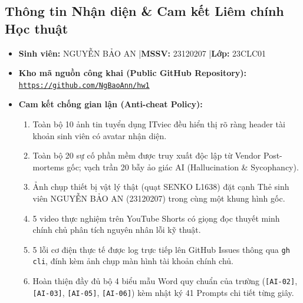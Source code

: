 \documentclass[11pt,a4paper]{article}
\begin{document}
\subsection{Thông tin Nhận diện \& Cam kết Liêm chính Học thuật}
\begin{itemize}
    \item \textbf{Sinh viên:} NGUYỄN BẢO AN \quad|\quad \textbf{MSSV:} 23120207 \quad|\quad \textbf{Lớp:} 23CLC01
    \item \textbf{Kho mã nguồn công khai (Public GitHub Repository):} \href{https://github.com/NgBaoAnn/hw1}{\texttt{https://github.com/NgBaoAnn/hw1}}
    \item \textbf{Cam kết chống gian lận (Anti-cheat Policy):}
    \begin{enumerate}
        \item Toàn bộ 10 ảnh tin tuyển dụng ITviec đều hiển thị rõ ràng header tài khoản sinh viên có avatar nhận diện.
        \item Toàn bộ 20 sự cố phần mềm được truy xuất độc lập từ Vendor Post-mortems gốc; vạch trần 20 bẫy ảo giác AI (Hallucination \& Sycophancy).
        \item Ảnh chụp thiết bị vật lý thật (quạt SENKO L1638) đặt cạnh Thẻ sinh viên NGUYỄN BẢO AN (23120207) trong cùng một khung hình gốc.
        \item 5 video thực nghiệm trên YouTube Shorts có giọng đọc thuyết minh chính chủ phân tích nguyên nhân lỗi kỹ thuật.
        \item 5 lỗi cơ điện thực tế được log trực tiếp lên GitHub Issues thông qua \texttt{gh cli}, đính kèm ảnh chụp màn hình tài khoản chính chủ.
        \item Hoàn thiện đầy đủ bộ 4 biểu mẫu Word quy chuẩn của trường (\texttt{[AI-02]}, \texttt{[AI-03]}, \texttt{[AI-05]}, \texttt{[AI-06]}) kèm nhật ký 41 Prompts chi tiết từng giây.
    \end{enumerate}
\end{itemize}
\end{document}
